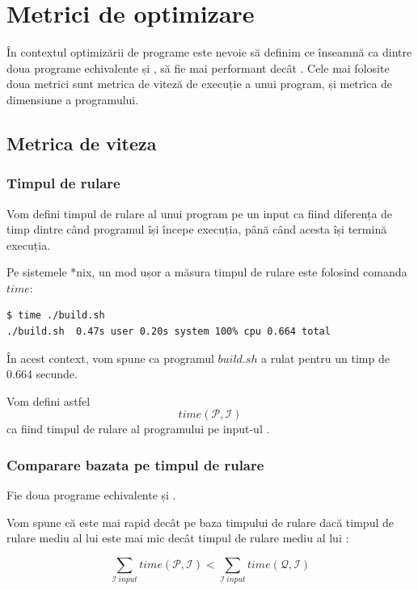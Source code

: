 \section{Metrici de optimizare}

În contextul optimizării de programe este nevoie să definim ce
înseamnă ca dintre doua programe echivalente  și , 
să fie mai performant decât .
Cele mai folosite doua metrici sunt metrica de viteză de
execuție a unui program, și metrica de dimensiune a programului.

\subsection{Metrica de viteza}

\subsubsection{Timpul de rulare}

Vom defini timpul de rulare al unui program  pe un input
 ca fiind diferența de timp dintre când programul își începe
execuția, până când acesta își termină execuția.

Pe sistemele *nix, un mod ușor a măsura timpul de rulare este
folosind comanda $time$:

\begin{lstlisting}[language=Bash]
$ time ./build.sh
./build.sh  0.47s user 0.20s system 100% cpu 0.664 total
\end{lstlisting}

În acest context, vom spune ca programul $build.sh$ a rulat
pentru un timp de 0.664 secunde.

Vom defini astfel \[time(\mathcal{P}, \mathcal{I})\] ca fiind
timpul de rulare al programului  pe input-ul .

\subsubsection{Comparare bazata pe timpul de rulare}

Fie doua programe echivalente  și .

Vom spune că  este mai rapid decât  pe baza timpului de
rulare dacă timpul de rulare mediu al lui  este mai mic
decât timpul de rulare mediu al lui :

\[
	\sum_{\mathcal{I} \ input} time(\mathcal{P}, \mathcal{I}) <
	\sum_{\mathcal{I} \ input} time(\mathcal{Q}, \mathcal{I})
\]

